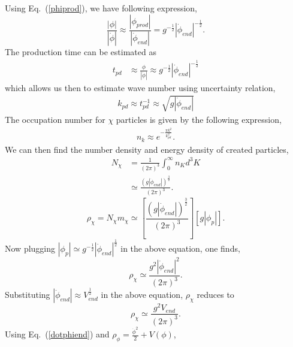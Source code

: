 \documentclass[prd,twocolumn,superscriptaddress]{revtex4}
\begin{document}
\begin{appendices}
Using Eq.~(\ref{phiprod}), we have following expression,
\begin{equation*}
\frac{\left| \phi \right|}{\left| \dot{\phi} \right|}
\approx \frac{\left| \phi_{prod} \right|}{\left| \dot{\phi}_{end} \right|}
= g^{- \frac{1}{2}} {\left| \dot{\phi}_{end} \right|}^{- \frac{1}{2}}.
\end{equation*}
The production time can be estimated\cite{VariableGravity, ala, SamiDadich, Starobinsky,Starobinsky2} as
\begin{align}
t_{pd} &\approx \frac{\phi}{\left| \dot{\phi} \right|}
\approx  g^{- \frac{1}{2}} {\left| \dot{\phi}_{end} \right|}^{- \frac{1}{2}}
\end{align}
  which allows us then to estimate wave number using uncertainty relation,
\begin{align}
k_{pd} \approx t_{pd}^{-1} \approx \sqrt{g \left| \dot{\phi}_{end} \right|}
\end{align}
The  occupation number for $\chi$ particles is given by the following expression,
\begin{align}
n_k \approx e^{- \frac{\pi k^2}{k_{pd}^{2}}}.
\end{align}
We can then find the number density and energy density of created particles,
\begin{align}
N_{\chi} &= \frac{1}{(2 \pi)^3} \int_{0}^{\infty}{n_K d^3 K} \nonumber \\
&\simeq \frac{{\left( g \left| \dot{\phi}_{end} \right| \right)}^{\frac{3}{2}}}{(2 \pi)^3}.
\end{align}
\begin{equation}
\rho_{\chi} = N_{\chi} m_{\chi}
\simeq \left[ \frac{{\left( g \left| \dot{\phi}_{end} \right| \right)}^{\frac{3}{2}}}{(2 \pi)^3} \right]
\left[ g \left| \phi_p \right| \right] .
\end{equation}
Now plugging $\left| \phi_p \right| \simeq g^{- \frac{1}{2}} {\left| \dot{\phi}_{end} \right|}^{\frac{1}{2}}$ in the above
equation, one finds,
\begin{equation}
\rho_{\chi} \simeq \frac{g^2 {\left| \dot{\phi}_{end} \right|}^2}{(2 \pi)^3} \label{rhochi}.
\end{equation}
Substituting $\left| \dot{\phi}_{end} \right| \approx V_{end}^{\frac{1}{2}}$ in the above equation, $\rho_{\chi}$ reduces to
\begin{equation}
\rho_{\chi} \simeq \frac{g^2 V_{end}}{(2 \pi)^3}.
\end{equation}
Using Eq.~(\ref{dotphiend}) and $\rho_{\phi}= \frac{\dot{\phi}^2}{2} + V(\phi)$,

\end{appendices}
\end{document}
